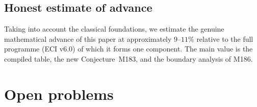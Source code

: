 \documentclass[12pt]{amsart}
\theoremstyle{definition}
\begin{document}
\subsection{Honest estimate of advance}

Taking into account the classical foundations, we estimate the genuine
mathematical advance of this paper at approximately $9$--$11\%$ relative
to the full programme (ECI v6.0) of which it forms one component.
The main value is the compiled table, the new Conjecture~M183, and the
boundary analysis of M186.

\section{Open problems}
\label{sec:open}
\end{document}

